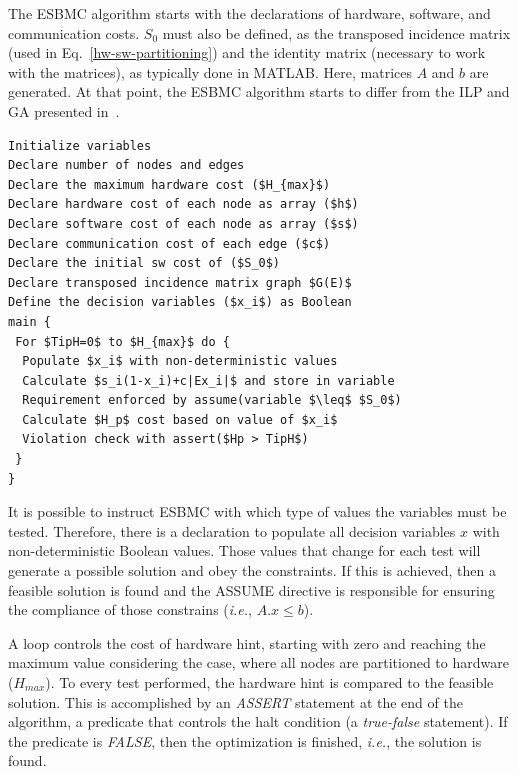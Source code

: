 \documentclass{doublecol-new}
\theoremstyle{TH}{
\newtheorem{lemma}{Lemma}
\newtheorem{theorem}[lemma]{Theorem}
\newtheorem{corrolary}[lemma]{Corrolary}
\newtheorem{conjecture}[lemma]{Conjecture}
\newtheorem{proposition}[lemma]{Proposition}
\newtheorem{claim}[lemma]{Claim}
\newtheorem{stheorem}[lemma]{Wrong Theorem}
\newtheorem{algorithm}{Algorithm}
}
\theoremstyle{THrm}{
\newtheorem{definition}{Definition}[section]
\newtheorem{question}{Question}[section]
\newtheorem{remark}{Remark}
\newtheorem{scheme}{Scheme}
}
\theoremstyle{THhit}{
\newtheorem{case}{Case}[section]
}
\begin{document}
The ESBMC algorithm starts with the declarations of hardware, software, and communication costs. $S_0$ must also be defined, as the transposed incidence matrix (used in Eq.~\eqref{hw-sw-partitioning}) and the identity matrix (necessary to work with the matrices), as typically done in MATLAB. Here, matrices $A$ and $b$ are generated. At that point, the ESBMC algorithm starts to differ from the ILP and GA presented in~\cite{Trindade2015}.

\begin{lstlisting}[basicstyle=\footnotesize,caption={Pseudocode describing sequential ESBMC.},label={Pseudocode-describing-ESBMC},numbersep=7pt,frame=tb,captionpos=t,numberstyle=\tiny,mathescape=true]
Initialize variables 
Declare number of nodes and edges
Declare the maximum hardware cost ($H_{max}$)
Declare hardware cost of each node as array ($h$)
Declare software cost of each node as array ($s$)
Declare communication cost of each edge ($c$)
Declare the initial sw cost of ($S_0$)
Declare transposed incidence matrix graph $G(E)$
Define the decision variables ($x_i$) as Boolean
main {
 For $TipH=0$ to $H_{max}$ do {
  Populate $x_i$ with non-deterministic values
  Calculate $s_i(1-x_i)+c|Ex_i|$ and store in variable
  Requirement enforced by assume(variable $\leq$ $S_0$)
  Calculate $H_p$ cost based on value of $x_i$
  Violation check with assert($Hp > TipH$)
 }
}
\end{lstlisting}

\vspace{2 mm}
It is possible to instruct ESBMC with which type of values the variables must be tested. Therefore, there is a declaration to populate all decision variables $x$ with non-deterministic Boolean values. Those values that change for each test will generate a possible solution and obey the constraints. If this is achieved, then a feasible solution is found and the ASSUME directive is responsible for ensuring the compliance of those constrains (\textit{i.e.}, $A.x \leq b$).

A loop controls the cost of hardware hint, starting with zero and reaching the maximum value considering the case, where all nodes are partitioned to hardware ($H_{max}$). To every test performed, the hardware hint is compared to the feasible solution. This is accomplished by an \textit{ASSERT} statement at the end of the algorithm, a predicate that controls the halt condition (a \textit{true-false} statement). If the predicate is \textit{FALSE}, then the optimization is finished, {\it i.e.}, the solution is found. 
\end{document}
